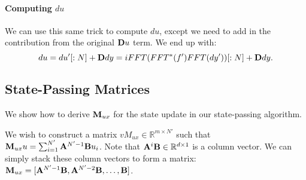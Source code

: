 \paragraph{Computing $du$}
We can use this same trick to compute $du$, except we need to add in the contribution from the original $\mathbf{D} u$ term.
We end up with:
$$du = du'[:N] + \mathbf{D} dy = iFFT(FFT^*(f')FFT(dy'))[:N] + \mathbf{D} dy.$$

\subsection{State-Passing Matrices}
\label{sec:state-passing-matrices}

We show how to derive $\mathbf{M}_{ux}$ for the state update in our state-passing algorithm.

We wish to construct a matrix $vM_{ux} \in \mathbb{R}^{m \times N'}$ such that $\mathbf{M}_{ux}u = \sum_{i=1}^{N'} \mathbf{A}^{N'-1}\mathbf{B} u_i$.
Note that $\mathbf{A}^i \mathbf{B} \in \mathbb{R}^{d \times 1}$ is a column vector.
We can simply stack these column vectors to form a matrix:
$\mathbf{M}_{ux} = [\mathbf{A}^{N'-1}\mathbf{B}, \mathbf{A}^{N'-2}\mathbf{B}, \dots, \mathbf{B}]$.
